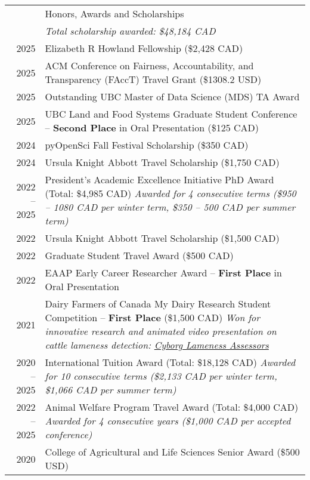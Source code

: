 \documentclass[letterpaper, 11pt]{article}
\newcommand{\headingfont}{\Large\color{OliveGreen}}
\newenvironment{SectionTableSingleSpace}[1]{
	\renewcommand*{\arraystretch}{1.2}
	\setlength{\tabcolsep}{10pt}
	\begin{longtable}{Rp{5.2in}} & #1 \\[0.6em]}
{\end{longtable}\vspace{-.3cm}}
\begin{document}
\begin{SectionTableSingleSpace}{\headingfont Honors, Awards and Scholarships}
& \textit{Total scholarship awarded: \$48,184 CAD} \\[6pt]
2025 &
Elizabeth R Howland Fellowship (\$2,428 CAD) \\
2025 &
ACM Conference on Fairness, Accountability, and Transparency (FAccT) Travel Grant (\$1308.2 USD) \\
2025 &
Outstanding UBC Master of Data Science (MDS) TA Award \\
2025 &
UBC Land and Food Systems Graduate Student Conference -- \textbf{Second Place} in Oral Presentation (\$125 CAD) \\
2024 & 
pyOpenSci Fall Festival Scholarship (\$350 CAD)  \\
2024 & 
Ursula Knight Abbott Travel Scholarship (\$1,750 CAD) \\
2022 -- 2025 & 
President's Academic Excellence Initiative PhD Award (Total: \$4,985 CAD) \newline
\textit{Awarded for 4 consecutive terms (\$950 -- 1080 CAD per winter term, \$350 -- 500 CAD per summer term)} \\
2022 & 
Ursula Knight Abbott Travel Scholarship (\$1,500 CAD) \\
2022 & 
Graduate Student Travel Award (\$500 CAD) \\
2022 & 
EAAP Early Career Researcher Award -- \textbf{First Place} in Oral Presentation \\
2021 & 
Dairy Farmers of Canada My Dairy Research Student Competition -- \textbf{First Place} (\$1,500 CAD) \newline
\textit{Won for innovative research and animated video presentation on cattle lameness detection: \href{https://youtu.be/HDe4uR7Tz9M?si=zMK2LjNmSAS5C4Mj}{Cyborg Lameness Assessors}} \\
2020 -- 2025 & 
International Tuition Award (Total: \$18,128 CAD) \newline
\textit{Awarded for 10 consecutive terms (\$2,133 CAD per winter term, \$1,066 CAD per summer term)} \\
2022 -- 2025 & 
Animal Welfare Program Travel Award (Total: \$4,000 CAD) \newline
\textit{Awarded for 4 consecutive years (\$1,000 CAD per accepted conference)} \\
2020 & 
College of Agricultural and Life Sciences Senior Award (\$500 USD) \newline

\end{SectionTableSingleSpace}
\end{document}
